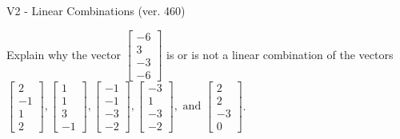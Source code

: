 \begin{exercise}
  \begin{exerciseTitle}V2 - Linear Combinations (ver. 460)\end{exerciseTitle}
  \begin{exerciseStatement}
    Explain why the vector \(\left[\begin{array}{c}
-6 \\
3 \\
-3 \\
-6
\end{array}\right]\)  is or is not a linear 
	combination of the vectors \(\left[\begin{array}{c}
2 \\
-1 \\
1 \\
2
\end{array}\right] , \left[\begin{array}{c}
1 \\
1 \\
3 \\
-1
\end{array}\right] , \left[\begin{array}{c}
-1 \\
-1 \\
-3 \\
-2
\end{array}\right] , \left[\begin{array}{c}
-3 \\
1 \\
-3 \\
-2
\end{array}\right] , \text{ and } \left[\begin{array}{c}
2 \\
2 \\
-3 \\
0
\end{array}\right]\).
	



\end{exerciseStatement}
\end{exercise}
